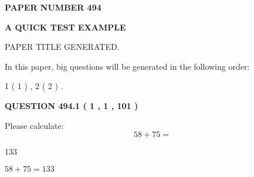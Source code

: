 \documentclass[12pt]{article}
\begin{document}
   
   
   
\newpage 
\setcounter{page}{ 
   494001 } 
   
   
   
   
 {\textbf{ \Large{ PAPER NUMBER  494  }}}
   
   
\vspace{0.2in}
   
   
   
   
   
   
   
   
 \vspace{0.2in}
{\LARGE {\textbf{ A QUICK TEST EXAMPLE}}}
   
   
 PAPER TITLE GENERATED.
   
   
   
\vspace{0.2in}
   
In this paper, big questions will be generated in the following order: 
   
   
   1 ( 1 )
 ,
   2 ( 2 )
 .
  
\vspace{0.2in}
  
{\textbf{\Large{QUESTION
494.1 
 ( 1 , 1 , 101 )
}}}
  
  
 
Please calculate:
\begin{equation}
58 +  %
75 = \nonumber
\end{equation}
 
 
 
\noindent{}
 
 

133
 
 
\noindent{}
 
 

 
 
 
\noindent{}
 
 

$ %
58 +  %
75=   %
133$
 
 
\noindent{}
 
 

 
   
\end{document}
